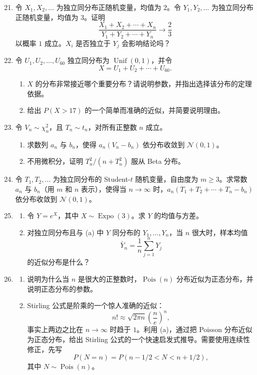 \documentclass[UTF8,12pt,a4paper,fontset=fandol]{ctexart}
\begin{document}
\begin{enumerate}
  \setcounter{enumi}{20}
  \item 令 $X_1,X_2,\ldots$ 为独立同分布正随机变量，均值为 $2$。令 $Y_1,Y_2,\ldots$ 为独立同分布正随机变量，均值为 $3$。证明
  \[
    \frac{X_1+X_2+\cdots+X_n}{Y_1+Y_2+\cdots+Y_n}\to \frac23
  \]
  以概率 $1$ 成立。$X_i$ 是否独立于 $Y_j$ 会影响结论吗？

  \item 令 $U_1,U_2,\ldots,U_{60}$ 独立同分布为 $\operatorname{Unif}(0,1)$，并令
  \[
    X=U_1+U_2+\cdots+U_{60}.
  \]
  \begin{enumerate}
    \item $X$ 的分布非常接近哪个重要分布？请说明参数，并指出选择该分布的定理依据。
    \item 给出 $P(X>17)$ 的一个简单而准确的近似，并简要说明理由。
  \end{enumerate}

  \item 令 $V_n\sim\chi_n^2$，且 $T_n\sim t_n$，对所有正整数 $n$ 成立。
  \begin{enumerate}
    \item 求数列 $a_n$ 与 $b_n$，使得 $a_n(V_n-b_n)$ 依分布收敛到 $\mathcal N(0,1)$。
    \item 不用微积分，证明 $T_n^2/(n+T_n^2)$ 服从 Beta 分布。
  \end{enumerate}

  \item 令 $T_1,T_2,\ldots$ 为独立同分布的 Student-$t$ 随机变量，自由度为 $m\ge 3$。求常数 $a_n$ 与 $b_n$（用 $m$ 和 $n$ 表示），使得当 $n\to\infty$ 时，$a_n(T_1+T_2+\cdots+T_n-b_n)$ 依分布收敛到 $\mathcal N(0,1)$。

  \item
  \begin{enumerate}
    \item 令 $Y=e^X$，其中 $X\sim\operatorname{Expo}(3)$。求 $Y$ 的均值与方差。
    \item 对独立同分布且与 (a) 中 $Y$ 同分布的 $Y_1,\ldots,Y_n$，当 $n$ 很大时，样本均值
    \[
      \bar Y_n=\frac1n\sum_{j=1}^n Y_j
    \]
    的近似分布是什么？
  \end{enumerate}

  \item
  \begin{enumerate}
    \item 说明为什么当 $n$ 是很大的正整数时，$\operatorname{Pois}(n)$ 分布近似为正态分布，并说明正态分布的参数。
    \item Stirling 公式是阶乘的一个惊人准确的近似：
    \[
      n!\approx \sqrt{2\pi n}\left(\frac ne\right)^n,
    \]
    事实上两边之比在 $n\to\infty$ 时趋于 $1$。利用 (a)，通过把 Poisson 分布近似为正态分布，给出 Stirling 公式的一个快速启发式推导。需要使用连续性修正，先写
    \[
      P(N=n)=P(n-1/2<N<n+1/2),
    \]
    其中 $N\sim\operatorname{Pois}(n)$。
  \end{enumerate}


\end{enumerate}
\end{document}
